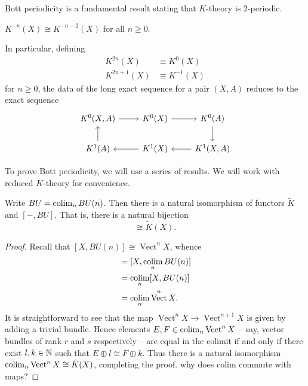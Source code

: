 \documentclass{amsart}
\DeclareMathOperator{\Vect}{Vect}
\begin{document}
Bott periodicity is a fundamental result stating that $K$-theory is 2-periodic.
\begin{theorem}
    $K^{-n}(X)\cong K^{-n-2}(X)$ for all $n\geqslant0$.
    \label{theorem:bott}
\end{theorem}

In particular, defining 
\begin{align*}
    K^{2n}(X)&\equiv K^0(X)\\
    K^{2n+1}(X)&\equiv K^{-1}(X)
\end{align*}
for $n\geqslant0$,
the data of the long exact sequence for a pair $(X,A)$ reduces to the exact sequence
\begin{equation*}
    \begin{tikzcd}
        K^0(X,A)\rar & K^0(X)\rar & K^0(A)\dar\\
        K^1(A)\uar & K^1(X)\lar & K^1(X,A)\lar
    \end{tikzcd}
\end{equation*}

To prove Bott periodicity, we will use a series of results. We will work with reduced
$K$-theory for convenience.

\begin{lemma}
    Write $BU=\operatorname*{colim}_nBU(n)$. Then there is a natural isomorphism of functors $\tilde K$ and $[-,BU]$.
    That is, there is a natural bijection
    \begin{equation*}
        [X, BU] \cong \tilde K(X).
    \end{equation*}
    \label{lemma:class}
\end{lemma}
\begin{proof}
    Recall that $[X, BU(n)]\cong\Vect^n X$, whence
    \begin{align*}
        [X,BU] &= [X,\colim_n BU(n)]\\
        &= \colim_n [X, BU(n)]\\
        &= \colim_n \Vect^n X.
    \end{align*}
    It is straightforward to see that the map $\Vect^n X\to\Vect^{n+1}X$ is given by adding a trivial
    bundle. Hence elements $E,F\in\colim_n\Vect^nX$ -- say, vector bundles of rank $r$ and $s$ respectively --
    are equal in the colimit if and only if there exist $l,k\in\mathbb{N}$ such that
    $E\oplus\underline{l}\cong F\oplus\underline{k}$. Thus there is a natural isomorphism
    $\colim_n\Vect^nX\cong \tilde K(X)$, completing the proof.
    {\color{red} why does colim commute with maps?}
\end{proof}
\end{document}
